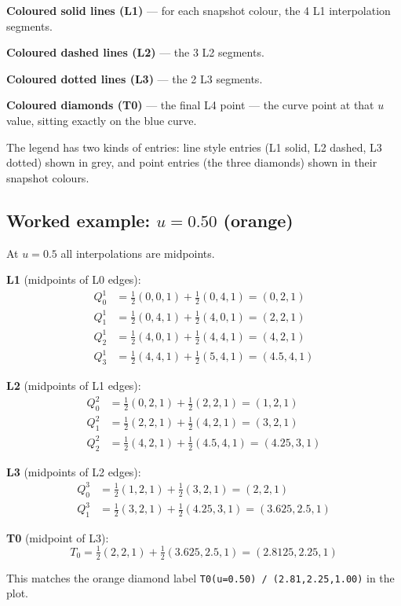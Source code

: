\documentclass[12pt, a4paper]{article}
\newcommand{\cd}[1]{\texttt{#1}}
\begin{document}
\textbf{Coloured solid lines (L1)} --- for each snapshot colour,
the 4 L1 interpolation segments.

\textbf{Coloured dashed lines (L2)} --- the 3 L2 segments.

\textbf{Coloured dotted lines (L3)} --- the 2 L3 segments.

\textbf{Coloured diamonds (T0)} --- the final L4 point ---
the curve point at that $u$ value, sitting exactly on
the blue curve.

The legend has two kinds of entries:
line style entries (L1 solid, L2 dashed, L3 dotted)
shown in grey, and point entries (the three diamonds)
shown in their snapshot colours.

\subsection{Worked example: $u = 0.50$ (orange)}

At $u = 0.5$ all interpolations are midpoints.

\begin{examplebox}
\textbf{L1} (midpoints of L0 edges):
\begin{align*}
  Q^1_0 &= \tfrac{1}{2}(0,0,1) + \tfrac{1}{2}(0,4,1) = (0,2,1) \\
  Q^1_1 &= \tfrac{1}{2}(0,4,1) + \tfrac{1}{2}(4,0,1) = (2,2,1) \\
  Q^1_2 &= \tfrac{1}{2}(4,0,1) + \tfrac{1}{2}(4,4,1) = (4,2,1) \\
  Q^1_3 &= \tfrac{1}{2}(4,4,1) + \tfrac{1}{2}(5,4,1) = (4.5,4,1)
\end{align*}

\textbf{L2} (midpoints of L1 edges):
\begin{align*}
  Q^2_0 &= \tfrac{1}{2}(0,2,1) + \tfrac{1}{2}(2,2,1) = (1,2,1) \\
  Q^2_1 &= \tfrac{1}{2}(2,2,1) + \tfrac{1}{2}(4,2,1) = (3,2,1) \\
  Q^2_2 &= \tfrac{1}{2}(4,2,1) + \tfrac{1}{2}(4.5,4,1) = (4.25,3,1)
\end{align*}

\textbf{L3} (midpoints of L2 edges):
\begin{align*}
  Q^3_0 &= \tfrac{1}{2}(1,2,1) + \tfrac{1}{2}(3,2,1) = (2,2,1) \\
  Q^3_1 &= \tfrac{1}{2}(3,2,1) + \tfrac{1}{2}(4.25,3,1) = (3.625,2.5,1)
\end{align*}

\textbf{T0} (midpoint of L3):
\[
  T_0 = \tfrac{1}{2}(2,2,1) + \tfrac{1}{2}(3.625,2.5,1)
      = (2.8125, 2.25, 1)
\]

This matches the orange diamond label \cd{T0(u=0.50) / (2.81,2.25,1.00)}
in the plot. \checkmark
\end{examplebox}
\end{document}
